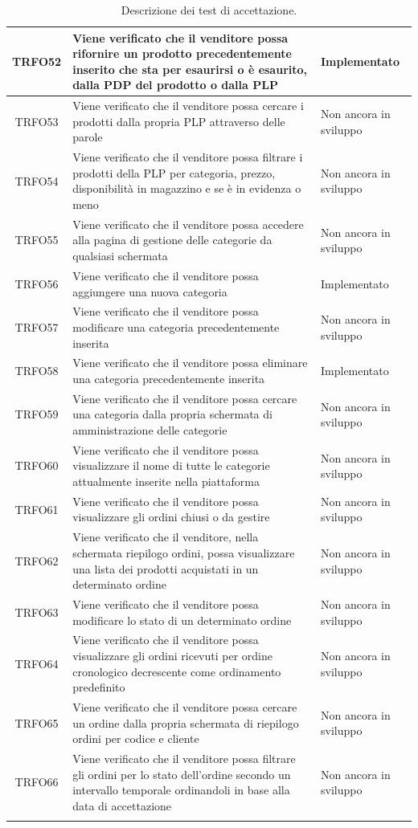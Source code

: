 \begin{longtable}{|c| C{10cm} |C{3cm}|}
	TRFO52 & Viene verificato che il venditore possa rifornire un prodotto precedentemente inserito che sta per esaurirsi o è esaurito, dalla PDP del prodotto o dalla PLP & Implementato\\ \hline
	TRFO53 & Viene verificato che il venditore possa cercare i prodotti dalla propria PLP attraverso delle parole & Non ancora in sviluppo\\ \hline
	TRFO54 & Viene verificato che il venditore possa filtrare i prodotti della PLP per categoria, prezzo, disponibilità in magazzino e se è in evidenza o meno & Non ancora in sviluppo\\ \hline
	TRFO55 & Viene verificato che il venditore possa accedere alla pagina di gestione delle categorie da qualsiasi schermata & Non ancora in sviluppo\\ \hline
	TRFO56 & Viene verificato che il venditore possa aggiungere una nuova categoria & Implementato\\ \hline
	TRFO57 & Viene verificato che il venditore possa modificare una categoria precedentemente inserita & Non ancora in sviluppo\\ \hline
	TRFO58 & Viene verificato che il venditore possa eliminare una categoria precedentemente inserita & Implementato\\ \hline
	TRFO59 & Viene verificato che il venditore possa cercare una categoria dalla propria schermata di amministrazione delle categorie & Non ancora in sviluppo\\ \hline
	TRFO60 & Viene verificato che il venditore possa visualizzare il nome di tutte le categorie attualmente inserite nella piattaforma & Non ancora in sviluppo\\ \hline
	TRFO61 & Viene verificato che il venditore possa visualizzare gli ordini chiusi o da gestire & Non ancora in sviluppo\\ \hline
	TRFO62 & Viene verificato che il venditore, nella schermata riepilogo ordini,  possa visualizzare una lista dei prodotti acquistati in un determinato ordine & Non ancora in sviluppo\\ \hline
	TRFO63 & Viene verificato che il venditore possa modificare lo stato di un determinato ordine & Non ancora in sviluppo\\ \hline
	TRFO64 & Viene verificato che il venditore possa visualizzare gli ordini ricevuti per ordine cronologico decrescente come ordinamento predefinito & Non ancora in sviluppo\\ \hline
	TRFO65 & Viene verificato che il venditore possa cercare un ordine dalla propria schermata di riepilogo ordini per codice e cliente & Non ancora in sviluppo\\ \hline
	TRFO66 & Viene verificato che il venditore possa filtrare gli ordini per lo stato dell'ordine secondo un intervallo temporale ordinandoli in base alla data di accettazione & Non ancora in sviluppo\\ 
	\caption{Descrizione dei test di accettazione.}
\end{longtable}